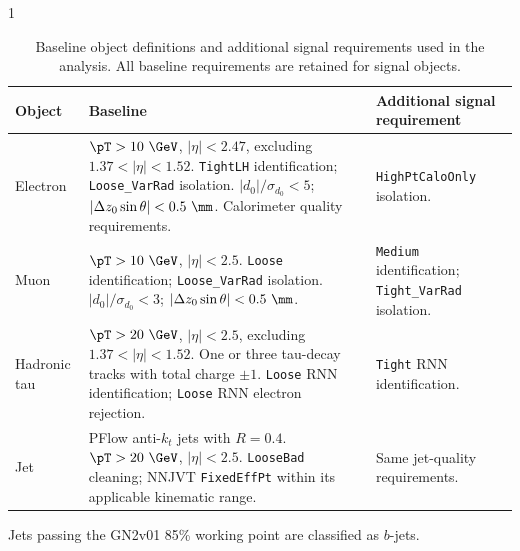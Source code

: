 \begin{table}[htbp]
    \begin{spacing}{1}
    \centering
    \small
    \setlength{\tabcolsep}{4pt}
    \renewcommand{\arraystretch}{1.12}
    \caption[Baseline and signal object definitions]{Baseline object definitions and additional signal requirements used in the analysis. All baseline requirements are retained for signal objects.}
    \label{tab:ch6_analysis_objects}
    \begin{tabular}{@{}>{\raggedright\arraybackslash}p{}>{\raggedright\arraybackslash}p{}>{\raggedright\arraybackslash}p{}@{}}
        \toprule
        Object & Baseline & Additional signal requirement \\
        \midrule
        Electron & $\pT>10~\GeV$, $|\eta|<2.47$, excluding $1.37<|\eta|<1.52$.\newline
        \texttt{TightLH} identification; \texttt{Loose\_VarRad} isolation.\newline
        $|d_0|/\sigma_{d_0}<5$; $|\Delta z_0\sin\theta|<0.5~\mm$.\newline
        Calorimeter quality requirements.
        & \texttt{HighPtCaloOnly} isolation. \\
        \addlinespace[0.6em]
        Muon & $\pT>10~\GeV$, $|\eta|<2.5$.\newline
        \texttt{Loose} identification; \texttt{Loose\_VarRad} isolation.\newline
        $|d_0|/\sigma_{d_0}<3$; $|\Delta z_0\sin\theta|<0.5~\mm$.
        & \texttt{Medium} identification; \texttt{Tight\_VarRad} isolation. \\
        \addlinespace[0.6em]
        Hadronic tau & $\pT>20~\GeV$, $|\eta|<2.5$, excluding $1.37<|\eta|<1.52$.\newline
        One or three tau-decay tracks with total charge $\pm1$.\newline
        \texttt{Loose} RNN identification; \texttt{Loose} RNN electron rejection.
        & \texttt{Tight} RNN identification. \\
        \addlinespace[0.6em]
        Jet & PFlow anti-$k_t$ jets with $R=0.4$.\newline
        $\pT>20~\GeV$, $|\eta|<2.5$.\newline
        \texttt{LooseBad} cleaning; NNJVT \texttt{FixedEffPt} within its applicable kinematic range.
        & Same jet-quality requirements. \\
        \bottomrule
    \end{tabular}
    \par\smallskip
    \raggedright Jets passing the GN2v01 85\% working point are classified as $b$-jets.
    \end{spacing}
\end{table}
